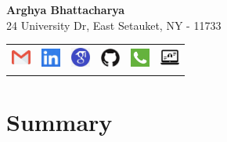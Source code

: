 \documentclass[letterpaper,10pt]{article}
\begin{document}
\begin{center}
\textbf{{\Huge Arghya Bhattacharya}} \\
\vspace{5pt}
{24 University Dr, East Setauket, NY - 11733} \\
\bigskip

\begin{tabular*}{\textwidth}{ m{3.5cm} m{3.5cm} m{3.5cm} m{3.5cm} m{3.5cm} m{3.5cm} }
\underline{\href{mailto:argbhattacha@cs.stonybrook.edu}{\includegraphics[width=0.25in,height=0.20in]{Figures/email.png}}} &
\underline{{\href{https://www.linkedin.com/in/arghya-bhattacharya-42522797/}{\includegraphics[width=0.25in,height=0.25in]{Figures/linkedin.png}}}} &
\underline{{\href{https://scholar.google.com/citations?user=tvw7c5wAAAAJ&hl=en}{\includegraphics[width=0.25in,height=0.25in]{Figures/googlescholar.png}}}} &
\underline{{\href{https://github.com/ArghyaB118}{\includegraphics[width=0.25in,height=0.25in]{Figures/github.png}}}} &
\underline{\href{tel:(+1)934-777-9896}{\includegraphics[width=0.25in,height=0.25in]{Figures/call.png}}} &
\underline{\href{https://www3.cs.stonybrook.edu/~argbhattacha/}{\includegraphics[width=0.25in,height=0.30in]{Figures/webpage.png}}} \\
\end{tabular*}
\end{center}

\section{Summary}
\end{document}
